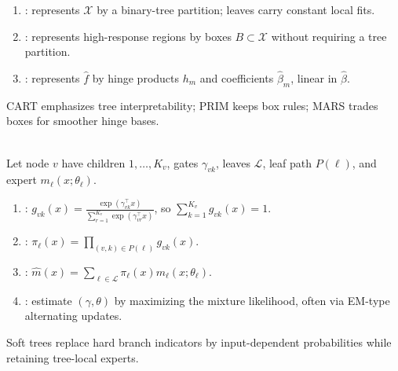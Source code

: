 \begin{remark} \label{rem:sl-adaptive-methods-versus-trees} 
\begin{enumerate}[label=(\roman*)]
\setlength{\itemsep}{0pt}
\item {}: represents $\mathcal X$ by a binary-tree partition; leaves carry constant local fits.
\item {}: represents high-response regions by boxes $B\subset\mathcal X$ without requiring a tree partition.
\item {}: represents $\widehat f$ by hinge products $h_m$ and coefficients $\widehat\beta_m$, linear in $\widehat\beta$.
\end{enumerate}
CART emphasizes tree interpretability; PRIM keeps box rules; MARS trades boxes for smoother hinge bases.
\end{remark}

\begin{remark} \label{rem:sl-soft-tree-mixtures-of-experts} \\
Let node $v$ have children $1,\ldots,K_v$, gates $\gamma_{vk}$, leaves $\mathcal L$, leaf path $P(\ell)$, and expert $m_\ell(x;\theta_\ell)$.
\begin{enumerate}[label=(\roman*)]
\setlength{\itemsep}{0pt}
\item {}: $g_{vk}(x)=\frac{\exp(\gamma_{vk}^\top x)}{\sum\limits_{r=1}^{K_v}\exp(\gamma_{vr}^\top x)}$, so $\sum\limits_{k=1}^{K_v}g_{vk}(x)=1$.
\item {}: $\pi_\ell(x)=\prod\limits_{(v,k)\in P(\ell)}g_{vk}(x)$.
\item {}: $\widehat m(x)=\sum\limits_{\ell\in\mathcal L}\pi_\ell(x)m_\ell(x;\theta_\ell)$.
\item {}: estimate $(\gamma,\theta)$ by maximizing the mixture likelihood, often via EM-type alternating updates.
\end{enumerate}
Soft trees replace hard branch indicators by input-dependent probabilities while retaining tree-local experts.
\end{remark}

